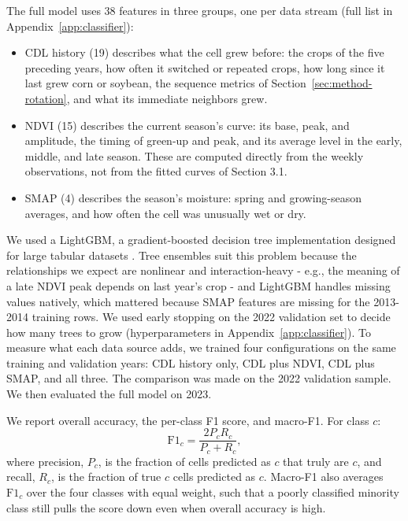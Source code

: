 \documentclass[10pt,letterpaper]{article}
\begin{document}
The full model uses 38 features in three groups, one per data stream (full list in Appendix~\ref{app:classifier}):

\begin{itemize}

\item CDL history (19) describes what the cell grew before: the crops of the five preceding years, how often it switched or repeated crops, how long since it last grew corn or soybean, the sequence metrics of Section~\ref{sec:method-rotation}, and what its immediate neighbors grew.

\item NDVI (15) describes the current season's curve: its base, peak, and amplitude, the timing of green-up and peak, and its average level in the early, middle, and late season. These are computed directly from the weekly observations, not from the fitted curves of Section 3.1.

\item SMAP (4) describes the season's moisture: spring and growing-season averages, and how often the cell was unusually wet or dry.

\end{itemize}

We used a LightGBM, a gradient-boosted decision tree implementation designed for large tabular datasets \citep{ke2017lightgbm}. Tree ensembles suit this problem because the relationships we expect are nonlinear and interaction-heavy - e.g., the meaning of a late NDVI peak depends on last year's crop - and LightGBM handles missing values natively, which mattered because SMAP features are missing for the 2013-2014 training rows. We used early stopping on the 2022 validation set to decide how many trees to grow (hyperparameters in Appendix~\ref{app:classifier}). To measure what each data source adds, we trained four configurations on the same training and validation years: CDL history only, CDL plus NDVI, CDL plus SMAP, and all three. The comparison was made on the 2022 validation sample. We then evaluated the full model on 2023.

We report overall accuracy, the per-class F1 score, and macro-F1. For class $c$:
\begin{equation}
\mathrm{F1}_c=\frac{2P_cR_c}{P_c+R_c},
\label{eq:f1}
\end{equation}
where precision, $P_c$, is the fraction of cells predicted as $c$ that truly are $c$, and recall, $R_c$, is the fraction of true $c$ cells predicted as $c$. Macro-F1 also averages $\mathrm{F1}_c$ over the four classes with equal weight, such that a poorly classified minority class still pulls the score down even when overall accuracy is high.
\end{document}
